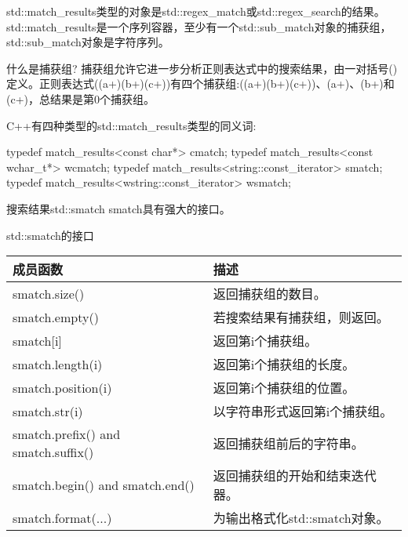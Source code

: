 

std::match\_results类型的对象是std::regex\_match或std::regex\_search的结果。std::match\_results是一个序列容器，至少有一个std::sub\_match对象的捕获组，std::sub\_match对象是字符序列。

\begin{myNotic}{什么是捕获组?}
捕获组允许它进一步分析正则表达式中的搜索结果，由一对括号()定义。正则表达式((a+)(b+)(c+))有四个捕获组:((a+)(b+)(c+))、(a+)、(b+)和(c+)，总结果是第0个捕获组。
\end{myNotic}

C++有四种类型的std::match\_results类型的同义词:

\begin{cpp}
typedef match_results<const char*> cmatch;
typedef match_results<const wchar_t*> wcmatch;
typedef match_results<string::const_iterator> smatch;
typedef match_results<wstring::const_iterator> wsmatch;
\end{cpp}

搜索结果std::smatch smatch具有强大的接口。

\begin{center}
std::smatch的接口
\end{center}

\begin{longtable}[c]{|l|l|}
\hline
\textbf{成员函数}            & \textbf{描述}                                       \\ \hline
\endfirsthead
%
\endhead
%
smatch.size()                       & 返回捕获组的数目。                      \\ \hline
smatch.empty()                      & 若搜索结果有捕获组，则返回。          \\ \hline
smatch{[}i{]}                       & 返回第i个捕获组。                            \\ \hline
smatch.length(i)                    & 返回第i个捕获组的长度。              \\ \hline
smatch.position(i)                  & 返回第i个捕获组的位置。            \\ \hline
smatch.str(i)                       & 以字符串形式返回第i个捕获组。                  \\ \hline
smatch.prefix() and smatch.suffix() & 返回捕获组前后的字符串。     \\ \hline
smatch.begin() and smatch.end()     & 返回捕获组的开始和结束迭代器。 \\ \hline
smatch.format(...)                  & 为输出格式化std::smatch对象。                \\ \hline
\end{longtable}

